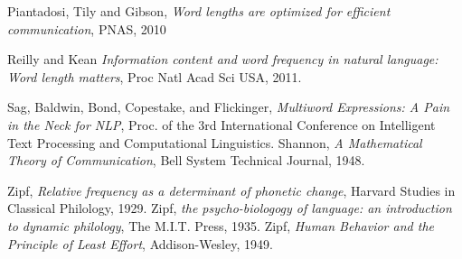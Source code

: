 \begin{thebibliography}{1}


 Piantadosi, Tily and Gibson, \emph{Word lengths are optimized for efficient communication}, PNAS, 2010

 Reilly and Kean \emph{Information content and word frequency in natural language: Word length matters}, Proc Natl Acad Sci USA, 2011.


 Sag, Baldwin, Bond, Copestake, and Flickinger, \emph{Multiword Expressions: A Pain in the Neck for NLP}, Proc. of the 3rd International Conference on Intelligent Text Processing and Computational Linguistics.
 Shannon, \emph{A Mathematical Theory of Communication}, Bell System Technical Journal, 1948.


 Zipf, \emph{Relative frequency as a determinant of phonetic change}, Harvard Studies in Classical Philology, 1929.
 Zipf, \emph{the psycho-biologogy of language: an introduction to dynamic philology}, The M.I.T. Press, 1935.
 Zipf, \emph{Human Behavior and the Principle of Least Effort}, Addison-Wesley, 1949. 


\end{thebibliography}





